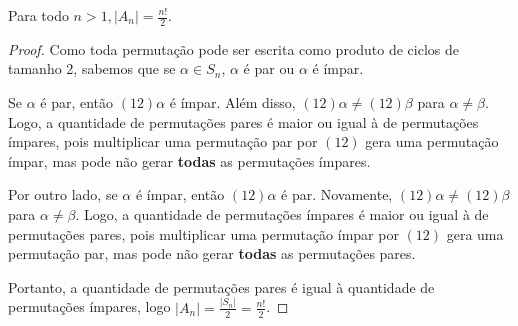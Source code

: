 	\begin{theorem}
	\label{ordem do grupo alternante}
		Para todo $n>1, |A_n| = \displaystyle{\frac{n!}{2}}$.
	\end{theorem}
	\begin{proof}
		Como toda permutação pode ser escrita como produto de 
		ciclos de tamanho 2, sabemos que se 
		$\alpha\in S_n$, $\alpha$ é par ou $\alpha$ é ímpar.
		\par\vspace{0.3cm} Se $\alpha$ é par, então $(12)\alpha$ é ímpar.
		Além disso, $(12)\alpha\neq (12)\beta$ para $\alpha\neq\beta$.
		Logo, a quantidade de permutações pares é maior ou igual à de
		permutações ímpares, pois multiplicar uma permutação par por
		$(12)$ gera uma permutação ímpar, mas pode não gerar
		\textbf{todas} as permutações ímpares.
		\par\vspace{0.3cm} Por outro lado, se $\alpha$ é ímpar, então
		$(12)\alpha$ é par. Novamente, $(12)\alpha\neq (12)\beta$ para
		$\alpha\neq\beta$. Logo, a quantidade de permutações ímpares é
		maior ou igual à de permutações pares, pois multiplicar uma
		permutação ímpar por $(12)$ gera uma permutação par, mas pode 
		não gerar \textbf{todas} as permutações pares.
		\par\vspace{0.3cm} Portanto, a quantidade de permutações pares é
		igual à quantidade de permutações ímpares, logo 
		$|A_n| = \displaystyle{\frac{|S_n|}{2} = \frac{n!}{2} }$.
	\end{proof} 

